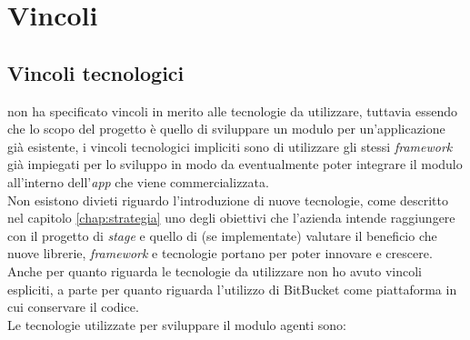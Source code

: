 \section{Vincoli}
\subsection{Vincoli tecnologici}\label{chap:vincoli tec}
{\company} non ha specificato vincoli in merito alle tecnologie da utilizzare, tuttavia essendo che lo scopo del progetto è quello di 
sviluppare un modulo per un'applicazione già esistente, i vincoli tecnologici impliciti sono di utilizzare gli stessi \textit{framework} già 
impiegati per lo sviluppo in modo da eventualmente poter integrare il modulo all'interno dell'\textit{app} che viene commercializzata.\\
Non esistono divieti riguardo l'introduzione di nuove tecnologie, come descritto nel capitolo \ref{chap:strategia} uno degli obiettivi 
che l'azienda intende raggiungere con il progetto di \textit{stage} e quello di (se implementate) valutare il beneficio che nuove librerie, \textit{framework} 
e tecnologie portano per poter innovare e crescere.\\
Anche per quanto riguarda le tecnologie da utilizzare non ho avuto vincoli espliciti, a parte per quanto riguarda l'utilizzo di BitBucket 
come piattaforma in cui conservare il codice.\\
Le tecnologie utilizzate per sviluppare il modulo agenti sono:
